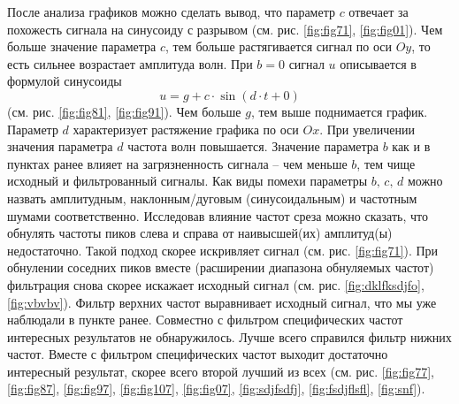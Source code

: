 \documentclass[a4paper, 12pt]{article}
\begin{document}
    
    После анализа графиков можно сделать вывод, что параметр $c$ отвечает за похожесть сигнала на синусоиду с разрывом
    (см. рис. \ref{fig:fig71}, \ref{fig:fig01}). Чем больше значение параметра $c$,
    тем больше растягивается сигнал по оси $Oy$, то есть сильнее возрастает амплитуда волн. При $b=0$ сигнал $u$ описывается
    в формулой синусоиды $$u=g+c\cdot\sin{(d\cdot t+0)}$$ (см. рис. \ref{fig:fig81}, \ref{fig:fig91}). Чем больше $g$, тем выше поднимается график.
    Параметр $d$ характеризует растяжение графика по оси $Ox$. При увеличении значения параметра $d$ частота волн повышается.
    Значение параметра $b$ как и в пунктах ранее влияет на загрязненность сигнала -- чем меньше $b$, тем чище исходный и фильтрованный сигналы.
    Как виды помехи параметры $b,\,c,\,d$ можно назвать амплитудным, наклонным/дуговым (синусоидальным) и частотным шумами соответственно.
    Исследовав влияние частот среза можно сказать, что обнулять частоты пиков слева и справа от наивысшей(их) амплитуд(ы) недостаточно. Такой
    подход скорее искривляет сигнал (см. рис. \ref{fig:fig71}). При обнулении соседних пиков вместе (расширении диапазона обнуляемых
    частот) фильтрация снова скорее искажает исходный сигнал (см. рис. \ref{fig:dklfksdjfo}, \ref{fig:vbvbv}). Фильтр верхних частот выравнивает исходный сигнал,
    что мы уже наблюдали в пункте ранее. Совместно с фильтром специфических частот интересных результатов не обнаружилось. Лучше всего справился фильтр нижних
    частот.
    Вместе с фильтром специфических частот выходит достаточно интересный результат, скорее всего второй лучший из всех (см. рис. \ref{fig:fig77}, \ref{fig:fig87},
    \ref{fig:fig97}, \ref{fig:fig107}, \ref{fig:fig07}, \ref{fig:sdjfsdfj}, \ref{fig:fsdjflsfl}, \ref{fig:snf}).
\end{document}

